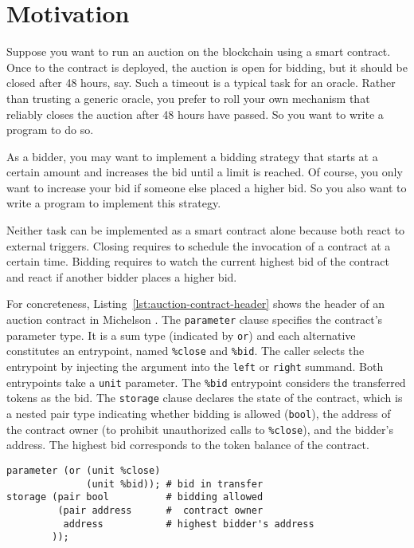 \documentclass[a4paper]{llncs}
\begin{document}
\section{Motivation}
\label{sec:motivation}

Suppose you want to run an auction on the blockchain using a smart
contract. Once to the contract is deployed, the
auction is open for bidding, but it should be closed after 48 hours,
say. Such a timeout is a typical task for an oracle. Rather than
trusting a generic oracle, you prefer to roll your own mechanism that reliably closes the auction
after 48 hours have passed. So you want to write a program to do so. 

As a bidder, you may want to implement a bidding
strategy that starts at a certain amount and increases the bid until a
limit is reached. Of course, you only want to increase your bid if
someone else placed a higher bid. So you also want to write a
program to implement this strategy.

Neither task can be implemented as a smart contract alone because both react
to external triggers. Closing requires to schedule the invocation of a
contract at a certain time. Bidding 
requires to watch the current highest bid of the contract and
react if another bidder places a higher bid.

For concreteness, Listing~\ref{lst:auction-contract-header} shows the
header of an auction contract in Michelson \cite{michelson}. The
\lstinline/parameter/ clause specifies the contract's parameter
type. It is a sum type (indicated by \lstinline/or/) and each
alternative constitutes an entrypoint, named \lstinline/%close/ and
\lstinline/%bid/. The caller selects the entrypoint by injecting the argument into the
\lstinline/left/ or \lstinline/right/ summand. Both entrypoints take a \lstinline{unit}
parameter. The \lstinline/%bid/ entrypoint considers the transferred
tokens as the bid.
The \lstinline/storage/ clause declares the state of the contract,
which is a nested pair type indicating whether bidding is allowed
(\lstinline{bool}), the address of the contract owner (to prohibit
unauthorized calls to \lstinline/%close/), and the bidder's
address. The highest bid corresponds to the token balance of the contract.
\begin{lstlisting}[language=michelson,numbers=none,float,caption={Header of the auction contract},label={lst:auction-contract-header},captionpos=b,emph={close,bid},emphstyle=\underbar]
parameter (or (unit %close)
              (unit %bid)); # bid in transfer
storage (pair bool          # bidding allowed
         (pair address      #  contract owner
          address           # highest bidder's address
        ));
\end{lstlisting}
\end{document}
